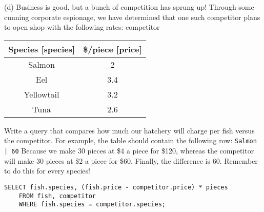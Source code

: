 \documentclass{exam}
\begin{document}
\begin{questions}
\begin{blocksection}
\end{blocksection}

\begin{blocksection} 
(d) Business is good, but a bunch of competition has sprung up! Through some cunning corporate espionage, we have determined that one such competitor plans to open shop with the following rates:\newline
\newline
competitor
\begin{center}
\begin{tabular}{ |c|c| } 
 \hline
 Species [species] & \$/piece [price] \\ 
 \hline
 Salmon & 2 \\ 
 \hline
 Eel & 3.4 \\ 
 \hline
  Yellowtail & 3.2  \\ 
 \hline
 Tuna & 2.6  \\ 
 \hline
\end{tabular}
\end{center}
Write a query that compares how much our hatchery will charge per fish versus the competitor. For example, the table should contain the following row: \newline
\texttt{Salmon | 60} \newline \newline
Because we make 30 pieces at \$4 a piece for \$120, whereas the competitor will make 30 pieces at \$2 a piece for \$60. Finally, the difference is 60. Remember to do this for every species!
\begin{solution}[1in]
\begin{lstlisting}
SELECT fish.species, (fish.price - competitor.price) * pieces 
    FROM fish, competitor 
    WHERE fish.species = competitor.species;
\end{lstlisting}
\end{solution}



\end{blocksection}
\end{questions}
\end{document}
